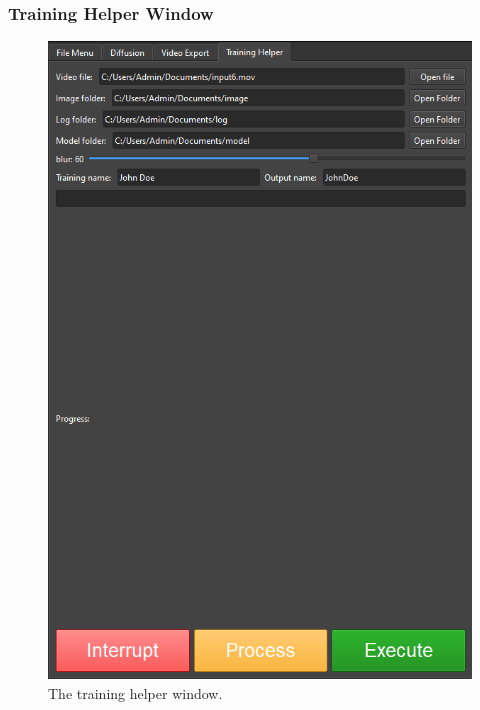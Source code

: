 \documentclass[preprint]{elsarticle}
\begin{document}
\subsubsection{Training Helper Window}
\begin{figure}[H]
	\centering
	\includegraphics[scale=0.5, keepaspectratio]{img/project_img/training-help.png}
	\caption{The training helper window.}\label{fig:training-helper}
\end{figure}
\end{document}
